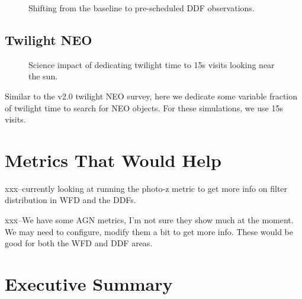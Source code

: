 \begin{figure}
\caption{Shifting from the baseline to pre-scheduled DDF observations.}
\end{figure}

\subsection{Twilight NEO}

\begin{figure}
\caption{Science impact of dedicating twilight time to 15s visits looking near the sun.  \label{fig:twi_15}}
\end{figure}

Similar to the v2.0 twilight NEO survey, here we dedicate some variable fraction of twilight time to search for NEO objects. For these simulations, we use 15s visits. 

\section{Metrics That Would Help}

xxx--currently looking at running the photo-z metric to get more info on filter distribution in WFD and the DDFs.

xxx--We have some AGN metrics, I'm not sure they show much at the moment. We may need to configure, modify them a bit to get more info. These would be good for both the WFD and DDF areas. 


\section{Executive Summary}

